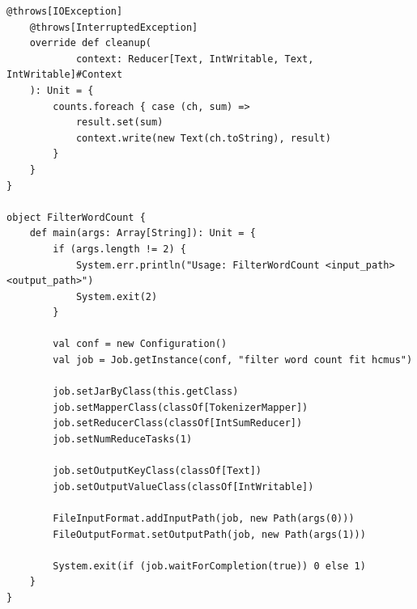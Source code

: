 \begin{lstlisting}[style=scalastyle, caption={Mã nguồn đầy đủ FilterWordCount.scala}]
    @throws[IOException]
    @throws[InterruptedException]
    override def cleanup(
            context: Reducer[Text, IntWritable, Text, IntWritable]#Context
    ): Unit = {
        counts.foreach { case (ch, sum) =>
            result.set(sum)
            context.write(new Text(ch.toString), result)
        }
    }
}

object FilterWordCount {
    def main(args: Array[String]): Unit = {
        if (args.length != 2) {
            System.err.println("Usage: FilterWordCount <input_path> <output_path>")
            System.exit(2)
        }

        val conf = new Configuration()
        val job = Job.getInstance(conf, "filter word count fit hcmus")

        job.setJarByClass(this.getClass)
        job.setMapperClass(classOf[TokenizerMapper])
        job.setReducerClass(classOf[IntSumReducer])
        job.setNumReduceTasks(1)

        job.setOutputKeyClass(classOf[Text])
        job.setOutputValueClass(classOf[IntWritable])

        FileInputFormat.addInputPath(job, new Path(args(0)))
        FileOutputFormat.setOutputPath(job, new Path(args(1)))

        System.exit(if (job.waitForCompletion(true)) 0 else 1)
    }
}
\end{lstlisting}
